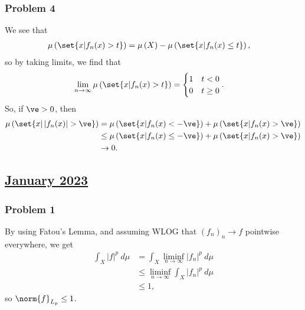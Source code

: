 \documentclass[10pt]{mypackage}
\begin{document}
\subsubsection{Problem 4}%
We see that
\begin{align*}
  \mu\left( \set{x | f_n(x) > t} \right) &= \mu\left( X \right) - \mu\left( \set{x | f_n(x) \leq t} \right),
\end{align*}
so by taking limits, we find that
\begin{align*}
  \lim_{n\rightarrow\infty} \mu\left( \set{x | f_n(x) > t} \right) &= \begin{cases}
    1 & t < 0\\
    0 & t\geq 0
  \end{cases}.
\end{align*}
So, if $\ve > 0$, then
\begin{align*}
  \mu\left( \set{x | \left\vert f_n(x) \right\vert > \ve} \right) &= \mu\left( \set{x | f_n(x) < -\ve} \right) + \mu\left( \set{x | f_n(x) > \ve} \right)\\
                                                                  &\leq \mu\left( \set{x | f_n(x)\leq -\ve} \right) + \mu\left( \set{x | f_n(x) > \ve} \right)\\
                                                                  &\rightarrow 0.
\end{align*}
\subsection{\href{https://math.virginia.edu/graduate/exams/analysis/2023Jan_real.pdf}{January 2023}}%
\subsubsection{Problem 1}%
By using Fatou's Lemma, and assuming WLOG that $\left( f_n \right)_n\rightarrow f$ pointwise everywhere, we get
\begin{align*}
  \int_{X}^{} \left\vert f \right\vert^{p}\:d\mu &= \int_{X}^{} \liminf_{n\rightarrow\infty} \left\vert f_n \right\vert^{p}\:d\mu\\
                                                 &\leq \liminf_{n\rightarrow\infty} \int_{X}^{} \left\vert f_n \right\vert^{p}\:d\mu\\
                                                 &\leq 1,
\end{align*}
so $\norm{f}_{L_p}\leq 1$.
\end{document}
